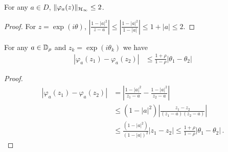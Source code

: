 \begin{lemma}\label{lemma:atom-hinf}
For any $a \in D$, 	$\|\varphi_a(z)\|_{\mathcal{H}_\infty} \leq 2$.
\end{lemma}
\begin{proof}
For $z = \exp(i\theta)$,	$|\frac{1-|a|^2}{z-a}|  \leq |\frac{1-|a|^2}{1-|a|}|  \leq 1+|a| \leq 2$.
\end{proof}

\begin{lemma}  \label{lemma:atom-lipschitz}
For any $a \in \mathbb{D}_\rho$ and $z_k=\exp(i\theta_k)$ we have 
\begin{align}
\label{eq:vary-freqs} |\varphi_a(z_1) - \varphi_a(z_2)| &\leq \frac{1+\rho}{1-\rho} |\theta_1-\theta_2|
\end{align}
\end{lemma}

\begin{proof}
\begin{align*}
|\varphi_a(z_1) - \varphi_a(z_2)|
& =   \left|\frac{1-|a|^2}{z_1-a}-\frac{1-|a|^2}{z_2-a}\right|\\
&\leq (1-|a|^2) \left|\frac{z_1-z_2}{(z_1-a)(z_2-a)} \right|\\
&\leq \frac{(1-|a|^2)}{(1-|a|)^2} |z_1-z_2| \leq \frac{1+\rho}{1-\rho} |\theta_1-\theta_2|\,.
\end{align*}
\end{proof}

